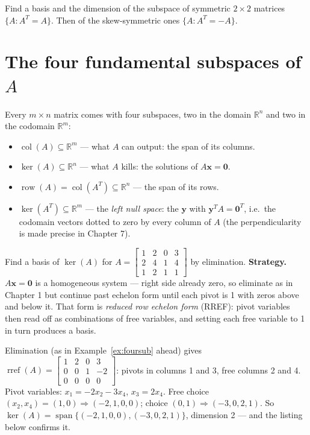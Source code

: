 \begin{exercise}[easy]
Find a basis and the dimension of the subspace of symmetric $2\times2$ matrices $\{A:A^{T}=A\}$. Then of the skew-symmetric ones $\{A:A^{T}=-A\}$.
\end{exercise}

\section{The four fundamental subspaces of \texorpdfstring{$A$}{A}}\label{sec:foursub}

Every $m\times n$ matrix comes with four subspaces, two in the domain $\mathbb{R}^n$ and two in the codomain $\mathbb{R}^m$:
\begin{itemize}
  \item $\operatorname{col}(A)\subseteq\mathbb{R}^m$ — what $A$ can output: the span of its columns.
  \item $\ker(A)\subseteq\mathbb{R}^n$ — what $A$ kills: the solutions of $A\mathbf{x}=\mathbf{0}$.
  \item $\operatorname{row}(A)=\operatorname{col}(A^{T})\subseteq\mathbb{R}^n$ — the span of its rows.
  \item $\ker(A^{T})\subseteq\mathbb{R}^m$ — the \emph{left null space}: the $\mathbf{y}$ with $\mathbf{y}^{T}A=\mathbf{0}^{T}$, i.e.\ the codomain vectors dotted to zero by every column of $A$ (the perpendicularity is made precise in Chapter 7).
\end{itemize}

\begin{example}\label{ex:nullbasis}
Find a basis of $\ker(A)$ for $A=\begin{bmatrix}1&2&0&3\\2&4&1&4\\1&2&1&1\end{bmatrix}$ by elimination.
\textbf{Strategy.} $A\mathbf{x}=\mathbf{0}$ is a homogeneous system — right side already zero, so eliminate as in Chapter 1 but continue past echelon form until each pivot is 1 with zeros above and below it. That form is \emph{reduced row echelon form} (RREF): pivot variables then read off as combinations of free variables, and setting each free variable to 1 in turn produces a basis.
\begin{solution}
Elimination (as in Example~\ref{ex:foursub} ahead) gives
\(
\operatorname{rref}(A)=\begin{bmatrix}1&2&0&3\\0&0&1&-2\\0&0&0&0\end{bmatrix}
\): pivots in columns 1 and 3, free columns 2 and 4. Pivot variables: $x_1=-2x_2-3x_4$, $x_3=2x_4$.
Free choice $(x_2,x_4)=(1,0)\Rightarrow(-2,1,0,0)$; choice $(0,1)\Rightarrow(-3,0,2,1)$.
So $\ker(A)=\operatorname{span}\{(-2,1,0,0),(-3,0,2,1)\}$, dimension 2 — and the listing below confirms it.
\end{solution}
\end{example}

